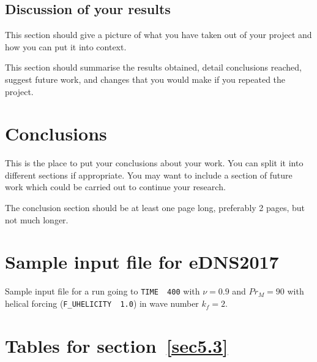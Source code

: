 \documentclass[12pt,a4paper]{report}
\begin{document}
\section{Discussion of your results}

This section should give a picture of what you have taken out of your
project and how you can put it into context.

This section should summarise the results obtained, detail conclusions
reached, suggest future work, and changes that you would make if you
repeated the project.

\chapter{Conclusions}

This is the place to put your conclusions about your work. You can
split it into different sections if appropriate. You may want to include
a section of future work which could be carried out to continue your
research.

The conclusion section should be at least one page long, preferably 2
pages, but not much longer.

\appendix
\chapter{Sample input file for eDNS2017}
\label{apx1}

Sample input file for a run going to \texttt{TIME~~400} with $\nu=0.9$ and $Pr_M=90$ with helical forcing (\texttt{F\_UHELICITY~~1.0}) in wave number $k_f=2$.



\chapter{Tables for section~\ref{sec5.3}}
\end{document}
